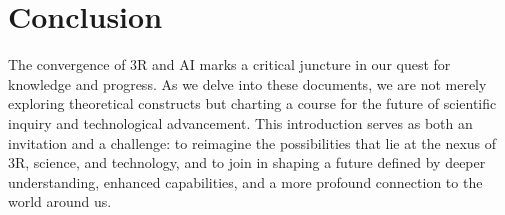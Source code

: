 \documentclass[12pt]{article}
\begin{document}
\section*{Conclusion}
The convergence of 3R and AI marks a critical juncture in our quest for knowledge and progress. As we delve into these documents, we are not merely exploring theoretical constructs but charting a course for the future of scientific inquiry and technological advancement. This introduction serves as both an invitation and a challenge: to reimagine the possibilities that lie at the nexus of 3R, science, and technology, and to join in shaping a future defined by deeper understanding, enhanced capabilities, and a more profound connection to the world around us.


\end{document}

